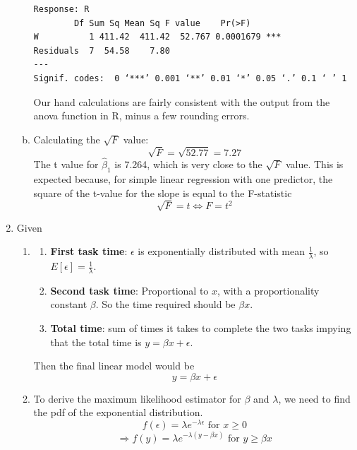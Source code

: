 \documentclass[12pt]{article}
\begin{document}
\begin{enumerate}[1.]
\begin{enumerate}[(a)]
\begin{verbatim}
Response: R
        Df Sum Sq Mean Sq F value    Pr(>F)    
W          1 411.42  411.42  52.767 0.0001679 ***
Residuals  7  54.58    7.80                      
---
Signif. codes:  0 ‘***’ 0.001 ‘**’ 0.01 ‘*’ 0.05 ‘.’ 0.1 ‘ ’ 1
            \end{verbatim}
            Our hand calculations are fairly consistent with the output from the anova
            function in R, minus a few rounding errors.
        \item Calculating the $\sqrt{F}$ value:
            \[ \sqrt{F} = \sqrt{52.77} = 7.27 \]
            The t value for $\hat{\beta}_1$ is 7.264, which is very close to the $\sqrt{F}$ 
            value. This is expected because, for simple linear regression with one 
            predictor, the square of the t-value for the slope is equal to the 
            F-statistic 
            \[ \sqrt{F} = t \Leftrightarrow F = t^2 \]
    \end{enumerate}
    
    \item Given
        \begin{enumerate}
            \item 
                \begin{enumerate}[-]
                    \item \textbf{First task time}: $\epsilon$ is 
                    exponentially distributed with mean $ \frac{1}{\lambda} $, so $E[\epsilon] = \frac{1}{\lambda}$.
                    \item \textbf{Second task time}: Proportional to $x$, with a proportionality constant $\beta$. So the time required 
                    should be $\beta x$.
                    \item \textbf{Total time}: sum of times it takes to complete the two tasks
                    impying that the total time is $y = \beta x + \epsilon$.
                \end{enumerate}
            
                Then the final linear model would be 
                \[y = \beta x + \epsilon \]

            \item To derive the maximum likelihood estimator for $\beta$ and $\lambda$, we need to find the pdf of the exponential distribution.
                \[f(\epsilon) = \lambda e^{-\lambda \epsilon} \text{ for } x \geq 0\]
                \[\Rightarrow f(y) = \lambda e^{-\lambda (y - \beta x)} \text{ for } y \geq \beta x\]


\end{enumerate}
\end{enumerate}
\end{document}
